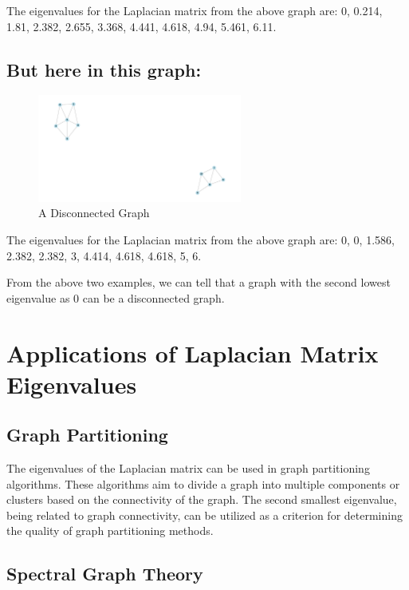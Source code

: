 \documentclass{article}
\begin{document}
The eigenvalues for the Laplacian matrix from the above graph are: 0, 0.214, 1.81, 2.382, 2.655, 3.368, 4.441, 4.618, 4.94, 5.461, 6.11.

\subsection*{But here in this graph:}
\begin{figure}[h]
    \centering
    \includegraphics[width=0.6\textwidth]{discon.png}
    \caption{A Disconnected Graph}
    \label{fig:disConnectedGraph}
\end{figure}

The eigenvalues for the Laplacian matrix from the above graph are: 0, 0, 1.586, 2.382, 2.382, 3, 4.414, 4.618, 4.618, 5, 6.

From the above two examples, we can tell that a graph with the second lowest eigenvalue as 0 can be a disconnected graph.



\section*{Applications of Laplacian Matrix Eigenvalues}

\subsection*{Graph Partitioning}

The eigenvalues of the Laplacian matrix can be used in graph partitioning algorithms. These algorithms aim to divide a graph into multiple components or clusters based on the connectivity of the graph. The second smallest eigenvalue, being related to graph connectivity, can be utilized as a criterion for determining the quality of graph partitioning methods.

\subsection*{Spectral Graph Theory}
\end{document}
